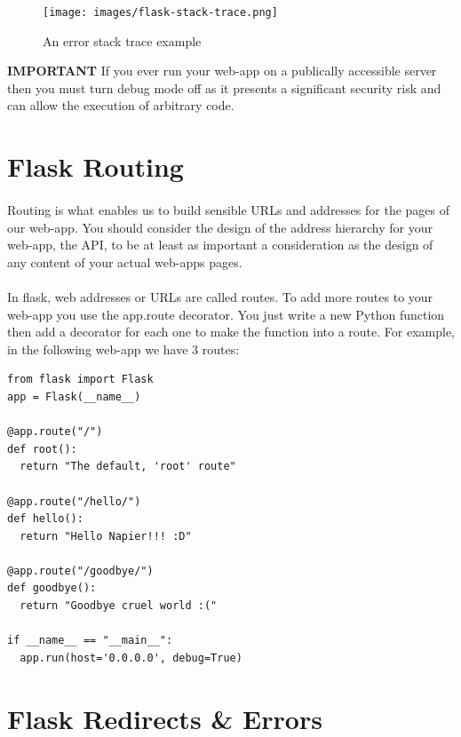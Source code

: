 \documentclass[12pt, a4paper, oneside]{book}
\begin{document}
\begin{figure}[H]
\centering
\texttt{[image: images/flask-stack-trace.png]}
\caption{An error stack trace example}
\label{fig:flask-stack-trace}
\end{figure}


\begin{framed}
\textbf{IMPORTANT} If you ever run your web-app on a publically accessible server then you must turn debug mode off as it presents a significant security risk and can allow the execution of arbitrary code.
\end{framed}

\section{Flask Routing}
\label{routing}
\paragraph{} Routing is what enables us to build sensible URLs and addresses for the pages of our web-app. You should consider the design of the address hierarchy for your web-app, the API, to be at least as important a consideration as the design of any content of your actual web-apps pages.

\paragraph{} In flask, web addresses or URLs are called routes. To add more routes to your web-app you use the app.route decorator. You just write a new Python function then add a decorator for each one to make the function into a route. For example, in the following web-app we have 3 routes:

\begin{lstlisting}
from flask import Flask
app = Flask(__name__)

@app.route("/")
def root():
  return "The default, 'root' route"

@app.route("/hello/")
def hello():
  return "Hello Napier!!! :D"

@app.route("/goodbye/")
def goodbye():
  return "Goodbye cruel world :("

if __name__ == "__main__":
  app.run(host='0.0.0.0', debug=True)
\end{lstlisting}

\section{Flask Redirects \& Errors}
\label{errors}
\end{document}
